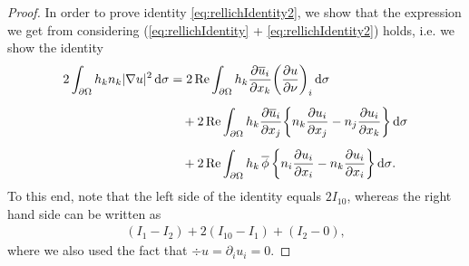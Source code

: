 \begin{proof}
  In order to prove identity \eqref{eq:rellichIdentity2}, we show that the expression we get from considering (\eqref{eq:rellichIdentity} + \eqref{eq:rellichIdentity2}) holds, i.e. we show the identity
  \begin{align*}
    2 \int_{\partial\Omega} h_k n_k |\nabla u|^2 \, {\operatorname{d}\!{\sigma}}
    &= 2 \operatorname{Re} \int_{\partial\Omega} h_k \frac{\partial \overline u_i}{\partial x_k} \bigg( \frac{\partial u}{\partial \nu} \bigg)_i \, {\operatorname{d}\!{\sigma}} \\[0.5em]
    &\quad + 2 \operatorname{Re} \int_{\partial\Omega} h_k \frac{\partial\overline u_i}{\partial x_j} \bigg\{ n_k \frac{\partial u_i}{\partial x_j} - n_j \frac{\partial u_i}{\partial x_k} \bigg\} \, {\operatorname{d}\!{\sigma}} \\[0.5em]
    &\quad+ 2 \operatorname{Re} \int_{\partial\Omega} h_k \, \overline \phi\,  \bigg\{ n_i \frac{\partial u_i}{\partial x_i} - n_k \frac{\partial u_i}{\partial x_i} \bigg\} \, {\operatorname{d}\!{\sigma}}.
  \end{align*}
  To this end, note that the left side of the identity equals $2 I_{10}$, whereas the right hand side can be written as 
  \begin{align*}
    (I_1 - I_2) + 2 (I_{10} - I_1) + (I_2 - 0),
  \end{align*}
  where we also used the fact that $\div u = \partial_i u_i = 0$.
\end{proof}

